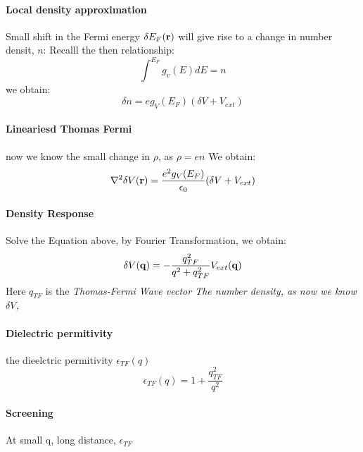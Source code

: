 \documentclass[12pt,a4paper]{article}
\begin{document}
\begin{enumerate}
                \paragraph*{Local density approximation}
                    Small shift in the Fermi energy $\delta E_F(\vb{r})$ will give rise to a change in number densit, $n$:
                    Recalll the then relationship:
                    \begin{equation}
                        \int^{E_F} g_v(E) dE = n
                    \end{equation}
                    we obtain:
                    \begin{equation}
                        \delta n = e g_V(E_F)(\delta V + V_{ext})
                    \end{equation}
                \paragraph*{Lineariesd Thomas Fermi}
                    now we know the small change in $\rho$, as $\rho = e n$
                    We obtain:
                    \begin{equation}
                        \laplacian{\delta V(\vb{r})} = \frac{e^2 g_V(E_F)}{\epsilon_0}(\delta V + V_{ext})
                    \end{equation}
                \paragraph {Density Response}
                    Solve the Equation above, by Fourier Transformation, we obtain:
                    \begin{equation}
                        \delta V(\vb{q}) = -\frac{q^2_{TF}}{q^2+q^2_{TF}}V_{ext}(\vb{q})
                    \end{equation}
                    Here $q_{TF}$ is the \it{Thomas-Fermi Wave vector}
                    The number density, as now we know $\delta V$, 
                \paragraph*{Dielectric permitivity}
                    the dieelctric permitivity $\epsilon_{TF}(q)$
                    \begin{equation}
                        \epsilon_{TF}(q)= 1+ \frac{q_{TF}^2}{q^2}
                    \end{equation}
                \paragraph*{Screening}
                    At small q, long distance, $\epsilon_{TF}$
            \end{enumerate}
\end{document}
